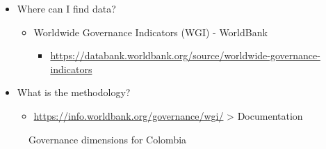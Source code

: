 \documentclass[
  ignorenonframetext,
]{beamer}
\providecommand{\tightlist}{%
  \setlength{\itemsep}{0pt}\setlength{\parskip}{0pt}}\usepackage{longtable,booktabs,array}
\begin{document}
\begin{frame}{}
\label{section-5}
\begin{itemize}
\item
  Where can I find data?

  \begin{itemize}
  \item
    Worldwide Governance Indicators (WGI) - WorldBank

    \begin{itemize}
    \tightlist
    \item
      \url{https://databank.worldbank.org/source/worldwide-governance-indicators}
    \end{itemize}
  \end{itemize}
\item
  What is the methodology?

  \begin{itemize}
  \tightlist
  \item
    \url{https://info.worldbank.org/governance/wgi/} \textgreater{}
    Documentation
  \end{itemize}
\end{itemize}
\end{frame}

\begin{frame}{}
\label{section-6}
\begin{figure}


\caption{\label{fig-governance-dimensions-col}Governance dimensions for
Colombia}

\end{figure}%
\end{frame}
\end{document}
